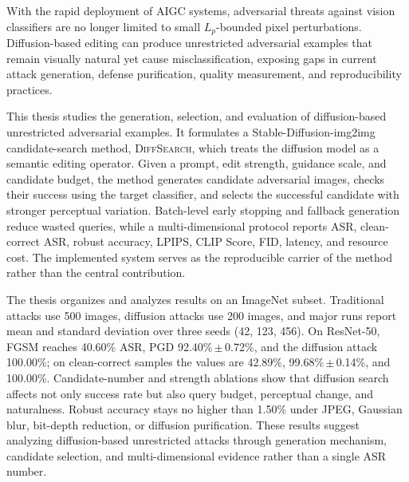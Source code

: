 \documentclass[type=bachelor,oneside]{fduthesis}
\newcommand{\methodname}{\textsc{DiffSearch}}
\begin{document}
\begin{abstract*}
With the rapid deployment of AIGC systems, adversarial threats against vision classifiers are no longer limited to small $L_p$-bounded pixel perturbations. Diffusion-based editing can produce unrestricted adversarial examples that remain visually natural yet cause misclassification, exposing gaps in current attack generation, defense purification, quality measurement, and reproducibility practices.

This thesis studies the generation, selection, and evaluation of diffusion-based unrestricted adversarial examples. It formulates a Stable-Diffusion-img2img candidate-search method, \methodname, which treats the diffusion model as a semantic editing operator. Given a prompt, edit strength, guidance scale, and candidate budget, the method generates candidate adversarial images, checks their success using the target classifier, and selects the successful candidate with stronger perceptual variation. Batch-level early stopping and fallback generation reduce wasted queries, while a multi-dimensional protocol reports ASR, clean-correct ASR, robust accuracy, LPIPS, CLIP Score, FID, latency, and resource cost. The implemented system serves as the reproducible carrier of the method rather than the central contribution.

The thesis organizes and analyzes results on an ImageNet subset. Traditional attacks use 500 images, diffusion attacks use 200 images, and major runs report mean and standard deviation over three seeds (42, 123, 456). On ResNet-50, FGSM reaches 40.60\% ASR, PGD 92.40\%\,$\pm$\,0.72\%, and the diffusion attack 100.00\%; on clean-correct samples the values are 42.89\%, 99.68\%\,$\pm$\,0.14\%, and 100.00\%. Candidate-number and strength ablations show that diffusion search affects not only success rate but also query budget, perceptual change, and naturalness. Robust accuracy stays no higher than 1.50\% under JPEG, Gaussian blur, bit-depth reduction, or diffusion purification. These results suggest analyzing diffusion-based unrestricted attacks through generation mechanism, candidate selection, and multi-dimensional evidence rather than a single ASR number.
\end{abstract*}


\mainmatter

\end{document}
